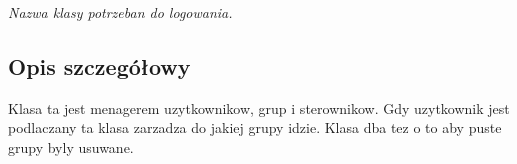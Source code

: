 \begin{DoxyCompactItemize}
\begin{DoxyCompactList}\small\item\em Nazwa klasy potrzeban do logowania. \item\end{DoxyCompactList}\end{DoxyCompactItemize}


\subsection{Opis szczegółowy}
\begin{DoxyVerb}Klasa ta jest menagerem uzytkownikow, grup i sterownikow. Gdy uzytkownik jest podlaczany ta klasa zarzadza do jakiej grupy idzie.
Klasa dba tez o to aby puste grupy byly usuwane.    
\end{DoxyVerb}
 


